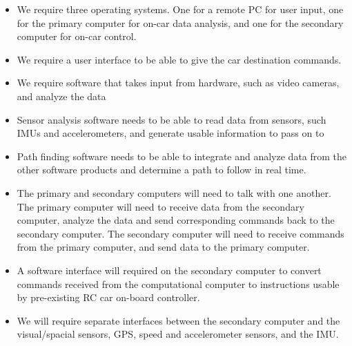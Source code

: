 \documentclass[draftclsnofoot,onecolumn,10pt]{IEEEtran}
\begin{document}
\begin{itemize}
	\item We require three operating systems. One for a remote PC for user input, one
	for the primary computer for on-car data analysis, and one for the secondary
	computer for on-car control.
	
	\item We require a user interface to be able to give the car destination commands. 
	
	\item We require software that takes input from hardware, such as video cameras,
	and analyze the data 
	
	\item Sensor analysis software needs to be able to read data from sensors, such IMUs
	and accelerometers, and generate usable information to pass on to 
	
	\item Path finding software needs to be able to integrate and analyze data from the
	other software products and determine a path to follow in real time.
	
	\item The primary and secondary computers will need to talk with one another. The
	primary computer will need to receive data from the secondary computer,
	analyze the data and send corresponding commands back to the secondary
	computer. The secondary computer will need to receive commands from the
	primary computer, and send data to the primary computer.
	
	\item A software interface will required on the secondary computer to convert
	commands received from the computational computer to instructions usable by
	pre-existing RC car on-board controller.
	
	\item We will require separate interfaces between the secondary computer and the
	visual/spacial sensors, GPS, speed and accelerometer sensors, and the IMU. 
	
\end{itemize}
\end{document}
